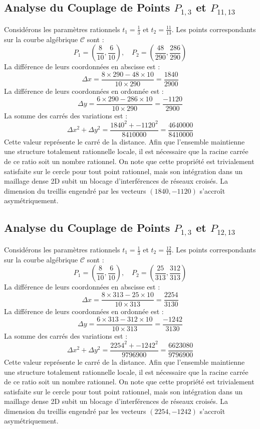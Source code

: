 \documentclass[12pt, a4paper]{article}
\begin{document}
\subsection{Analyse du Couplage de Points $P_{1,3}$ et $P_{11,13}$}
Considérons les paramètres rationnels $t_1 = \frac{1}{3}$ et $t_2 = \frac{11}{13}$.
Les points correspondants sur la courbe algébrique $\mathcal{C}$ sont :
$$ P_1 = \left( \frac{8}{10}, \frac{6}{10} \right), \quad P_2 = \left( \frac{48}{290}, \frac{286}{290} \right) $$
La différence de leurs coordonnées en abscisse est :
$$ \Delta x = \frac{8 \times 290 - 48 \times 10}{10 \times 290} = \frac{1840}{2900} $$
La différence de leurs coordonnées en ordonnée est :
$$ \Delta y = \frac{6 \times 290 - 286 \times 10}{10 \times 290} = \frac{-1120}{2900} $$
La somme des carrés des variations est :
$$ \Delta x^2 + \Delta y^2 = \frac{ 1840^2 + -1120^2 }{ 8410000 } = \frac{ 4640000 }{ 8410000 } $$
Cette valeur représente le carré de la distance. Afin que l'ensemble maintienne une structure totalement rationnelle locale, il est nécessaire que la racine carrée de ce ratio soit un nombre rationnel. On note que cette propriété est trivialement satisfaite sur le cercle pour tout point rationnel, mais son intégration dans un maillage dense 2D subit un blocage d'interférences de réseaux croisés. La dimension du treillis engendré par les vecteurs $( 1840, -1120 )$ s'accroît asymétriquement.


\subsection{Analyse du Couplage de Points $P_{1,3}$ et $P_{12,13}$}
Considérons les paramètres rationnels $t_1 = \frac{1}{3}$ et $t_2 = \frac{12}{13}$.
Les points correspondants sur la courbe algébrique $\mathcal{C}$ sont :
$$ P_1 = \left( \frac{8}{10}, \frac{6}{10} \right), \quad P_2 = \left( \frac{25}{313}, \frac{312}{313} \right) $$
La différence de leurs coordonnées en abscisse est :
$$ \Delta x = \frac{8 \times 313 - 25 \times 10}{10 \times 313} = \frac{2254}{3130} $$
La différence de leurs coordonnées en ordonnée est :
$$ \Delta y = \frac{6 \times 313 - 312 \times 10}{10 \times 313} = \frac{-1242}{3130} $$
La somme des carrés des variations est :
$$ \Delta x^2 + \Delta y^2 = \frac{ 2254^2 + -1242^2 }{ 9796900 } = \frac{ 6623080 }{ 9796900 } $$
Cette valeur représente le carré de la distance. Afin que l'ensemble maintienne une structure totalement rationnelle locale, il est nécessaire que la racine carrée de ce ratio soit un nombre rationnel. On note que cette propriété est trivialement satisfaite sur le cercle pour tout point rationnel, mais son intégration dans un maillage dense 2D subit un blocage d'interférences de réseaux croisés. La dimension du treillis engendré par les vecteurs $( 2254, -1242 )$ s'accroît asymétriquement.
\end{document}
